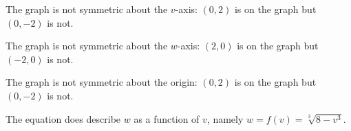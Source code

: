 \documentclass{ximera}
\begin{document}
\begin{multicols}{2}
\begin{enumerate}
\begin{flushleft}
\smallskip

The graph is not symmetric about the $v$-axis:  $(0,2)$ is on the graph but $(0,-2)$ is not. \smallskip

The graph is not symmetric about the $w$-axis: $(2, 0)$ is on the graph but $(-2, 0)$ is not. \smallskip

The graph is not symmetric about the origin: $(0, 2)$ is on the graph but $(0, -2)$ is not.  \smallskip

The equation does  describe $w$ as a function of $v$, namely $w=f(v) = \sqrt[3]{8-v^3}$.  \smallskip

\end{flushleft}

\setcounter{HW}{\value{enumi}}
\end{enumerate}
\end{multicols}

\pagebreak
\end{document}
